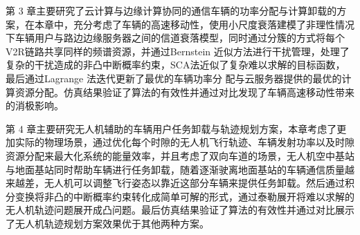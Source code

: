 第 3 章主要研究了云计算与边缘计算协同的通信车辆的功率分配与计算卸载的方案，在本章中，充分考虑了车辆的高速移动性，使用小尺度衰落建模了非理性情况下车辆用户与路边边缘服务器之间的信道衰落模型，同时通过分簇的方式将每个V2R链路共享同样的频谱资源，并通过Bernstein 近似方法进行干扰管理，处理了复杂的干扰造成的非凸中断概率约束，SCA法近似了复杂难以求解的目标函数，最后通过Lagrange 法迭代更新了最优的车辆功率分
配与云服务器提供的最优的计算资源分配。仿真结果验证了算法的有效性并通过对比发现了车辆高速移动性带来的消极影响。

第 4 章主要研究无人机辅助的车辆用户任务卸载与轨迹规划方案，本章考虑了更加实际的物理场景，通过优化每个时隙的无人机飞行轨迹、车辆发射功率以及时隙资源分配来最大化系统的能量效率，并且考虑了双向车道的场景，无人机空中基站与地面基站同时帮助车辆进行任务卸载，随着逐渐驶离地面基站的车辆通信质量越来越差，无人机可以调整飞行姿态以靠近这部分车辆来提供任务卸载。然后通过积分变换将非凸的中断概率约束转化成简单可解的形式，通过泰勒展开将难以求解的无人机轨迹问题展开成凸问题。最后仿真结果验证了算法的有效性并通过对比展示了无人机轨迹规划方案效果优于其他两种方案。

